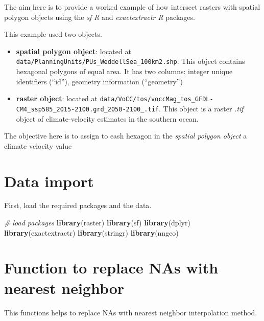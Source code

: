 \documentclass[]{book}
\newenvironment{Shaded}{\begin{snugshade}}{\end{snugshade}}
\newcommand{\CommentTok}[1]{\textcolor[rgb]{0.56,0.35,0.01}{\textit{#1}}}
\newcommand{\KeywordTok}[1]{\textcolor[rgb]{0.13,0.29,0.53}{\textbf{#1}}}
\newcommand{\NormalTok}[1]{#1}
\providecommand{\tightlist}{%
  \setlength{\itemsep}{0pt}\setlength{\parskip}{0pt}}
\begin{document}
The aim here is to provide a worked example of how intersect rasters with spatial polygon objects using the \emph{sf R} and \emph{exactextractr R} packages.

This example used two objects.

\begin{itemize}
\tightlist
\item
  \textbf{spatial polygon object}: located at \texttt{data/PlanningUnits/PUs\_WeddellSea\_100km2.shp}. This object contains hexagonal polygons of equal area. It has two columns: integer unique identifiers (``id''), geometry information (``geometry'')\\
\item
  \textbf{raster object}: located at \texttt{data/VoCC/tos/voccMag\_tos\_GFDL-CM4\_ssp585\_2015-2100.grd\_2050-2100\_.tif}. This object is a raster \emph{.tif} object of climate-velocity estimates in the southern ocean.
\end{itemize}

The objective here is to assign to eash hexagon in the \emph{spatial polygon object} a climate velocity value

\hypertarget{data-import-2}{%
\section{Data import}\label{data-import-2}}

First, load the required packages and the data.

\begin{Shaded}
\begin{Highlighting}[]
\CommentTok{# load packages}
  \KeywordTok{library}\NormalTok{(raster)}
  \KeywordTok{library}\NormalTok{(sf)}
  \KeywordTok{library}\NormalTok{(dplyr)}
  \KeywordTok{library}\NormalTok{(exactextractr)}
  \KeywordTok{library}\NormalTok{(stringr)}
  \KeywordTok{library}\NormalTok{(nngeo)}
\end{Highlighting}
\end{Shaded}

\hypertarget{function-to-replace-nas-with-nearest-neighbor}{%
\section{Function to replace NAs with nearest neighbor}\label{function-to-replace-nas-with-nearest-neighbor}}

This functions helps to replace NAs with nearest neighbor interpolation method.
\end{document}
